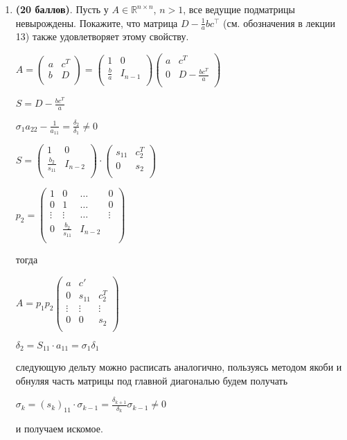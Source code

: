 \documentclass[a4paper, 11pt]{article}
\newcommand{\prob}[1]{\item \textbf{(#1 баллов)}.}
\begin{document}
\begin{enumerate}
			
		
		\prob{20} Пусть у $A\in\mathbb{R}^{n\times n}$, $n>1$, все ведущие подматрицы невырождены. Покажите, что матрица $D - \frac{1}{a}bc^\top$ (см. обозначения в лекции 13) также удовлетворяет этому свойству.
		
			$A = \begin{pmatrix}
				a & c^T \\
				b & D \\
			\end{pmatrix} = \begin{pmatrix}
				1  & 0 \\
				\frac{b}{a} & I_{n - 1} \\
			\end{pmatrix} \begin{pmatrix}
			a & c^T \\ 
			0 & D - \frac{bc^T}{a} \\
			\end{pmatrix}$
			
			$S = D - \frac{b c^T}{a}$
			
			$\sigma_1 a_{22} - \frac{1}{a_{11}} = \frac{\delta_2}{\delta_1} \neq 0$
			
			$S = \begin{pmatrix}
				1 & 0 \\
				\frac{b_2}{s_{11}} & I_{n - 2} \\
			\end{pmatrix} \cdot \begin{pmatrix}
			s_{11} & c_2^T \\ 
			0 & s_2 \\
			\end{pmatrix}$
			
			$p_2 = \begin{pmatrix}
				1 & 0 & \dots & 0 \\
				0 & 1 & \dots & 0 \\
				\vdots & \vdots & \dots & \vdots \\
				0 & \frac{b_2}{s_{11}} & I_{n - 2} \\
			\end{pmatrix}$
			
			тогда 
			
			$A = p_1 p_2 \begin{pmatrix}
				a & c' \\
				0  &s_{11} & c_2^T \\
				\vdots & \vdots & \vdots \\
				0 & 0 & s_2 \\
			\end{pmatrix}$
			
			
			$\delta_2 = S_{11} \cdot a_{11} = \sigma_1 \delta_1$
			
			следующую дельту можно расписать аналогично, пользуясь методом якоби и обнуляя часть матрицы под главной диагональю будем получать 
			
			$\sigma_k = (s_k)_{11} \cdot \sigma_{k - 1}  = \frac{\delta_{k + 1}}{\delta_{k}} \sigma_{k - 1} \neq 0$
			
			и получаем искомое.
		
	\end{enumerate}
	
\end{document}
